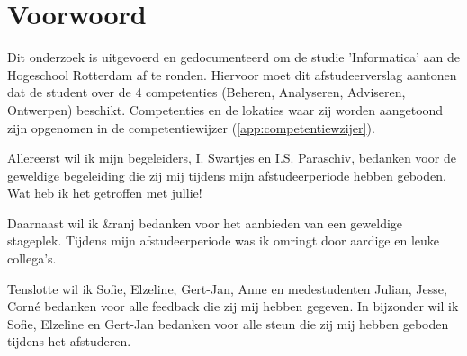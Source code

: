 \chapter*{Voorwoord}
Dit onderzoek is uitgevoerd en gedocumenteerd om de studie 'Informatica' aan de Hogeschool Rotterdam af te ronden. Hiervoor moet dit afstudeerverslag aantonen dat de student over de 4 competenties (Beheren, Analyseren, Adviseren, Ontwerpen) beschikt. Competenties en de lokaties waar zij worden aangetoond zijn opgenomen in de competentiewijzer (\autoref{app:competentiewzijer}).

\vspace{5mm}

\noindent
Allereerst wil ik mijn begeleiders, I. Swartjes en I.S. Paraschiv, bedanken voor de geweldige begeleiding die zij mij tijdens mijn afstudeerperiode hebben geboden. Wat heb ik het getroffen met jullie!

\vspace{5mm}

\noindent
Daarnaast wil ik \&ranj bedanken voor het aanbieden van een geweldige stageplek. Tijdens mijn afstudeerperiode was ik omringt door aardige en leuke collega's.

\vspace{5mm}

\noindent
Tenslotte wil ik Sofie, Elzeline, Gert-Jan, Anne en medestudenten Julian, Jesse, Corné bedanken voor alle feedback die zij mij hebben gegeven. In bijzonder wil ik Sofie, Elzeline en Gert-Jan bedanken voor alle steun die zij mij hebben geboden tijdens het afstuderen.